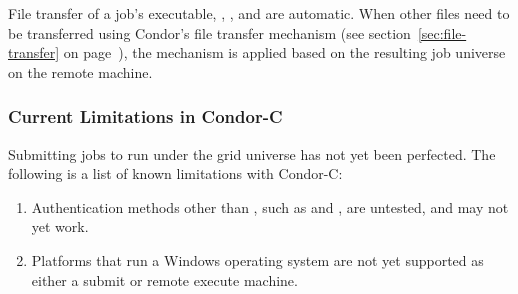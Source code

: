 File transfer of a job's executable, , , and
 are automatic.
When other files need to be transferred using Condor's file transfer
mechanism
(see section~\ref{sec:file-transfer} on page~\pageref{sec:file-transfer}),
the mechanism is applied based on the resulting job universe on the
remote machine.


%

\subsubsection{\label{sec:Condor-C-Limits}Current Limitations in Condor-C}
Submitting jobs to run under the grid universe has not yet
been perfected.
The following is a list of known limitations with Condor-C:

\begin{enumerate}
  \item{Authentication methods other than
  , such as  and , are 
  untested, and may not yet work.}

  \item{Platforms that run a Windows operating system
are not yet supported as either a submit or remote execute
machine.}
\end{enumerate}



